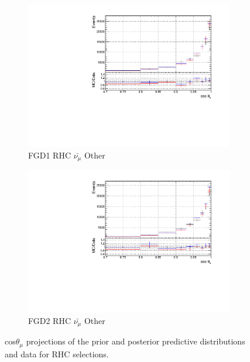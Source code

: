 \begin{figure}[!h]
\begin{subfigure}{0.49\textwidth}
  \centering
  \includegraphics[width=\textwidth]{figs/priorpred1D_t_FGD1_anti-numuCC_other}
  \caption{FGD1 RHC $\bar{\nu_{\mu}}$ Other}
\end{subfigure}
\begin{subfigure}{0.49\textwidth}
  \centering
  \includegraphics[width=\textwidth]{figs/priorpred1D_t_FGD2_anti-numuCC_other}
  \caption{FGD2 RHC $\bar{\nu_{\mu}}$ Other}
\end{subfigure}
\caption{cos$\theta_{\mu}$ projections of the prior and posterior predictive distributions and data for RHC \numub selections.}
\label{fig:priorpost_rhc_numub_t}
\end{figure}

